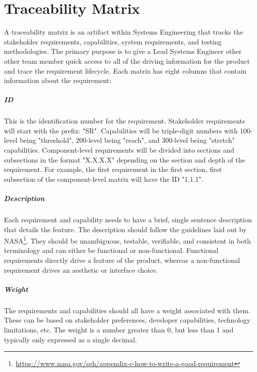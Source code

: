 \chapter{Traceability Matrix} 
A traceability matrix is an artifact within Systems Engineering that tracks the stakeholder requirements, capabilities, system requirements, and testing methodologies.
The primary purpose is to give a Lead Systems Engineer other other team member quick access to all of the driving information for the product and trace the requirement lifecycle.
Each matrix has eight columns that contain information about the requirement:

\paragraph*{ID} This is the identification number for the requirement.
Stakeholder requirements will start with the prefix: "SR".
Capabilities will be triple-digit numbers with 100-level being "threshold", 200-level being "reach", and 300-level being "stretch" capabilities.
Component-level requirements will be divided into sections and subsections in the format "X.X.X.X" depending on the section and depth of the requirement.
For example, the first requirement in the first section, first subsection of the component-level matrix will have the ID "1.1.1".

\paragraph*{Description} Each requirement and capability needs to have a brief, single sentence description that details the feature.
The description should follow the guidelines laid out by NASA\footnote{\url{https://www.nasa.gov/seh/appendix-c-how-to-write-a-good-requirement}}.
They should be unambiguous, testable, verifiable, and consistent in both terminology and can either be functional or non-functional.
Functional requirements directly drive a feature of the product, whereas a non-functional requirement drives an aesthetic or interface choice.

\paragraph*{Weight} The requirements and capabilities should all have a weight associated with them.
These can be based on stakeholder preferences, developer capabilities, technology limitations, etc.
The weight is a number greater than 0, but less than 1 and typically only expressed as a single decimal.

